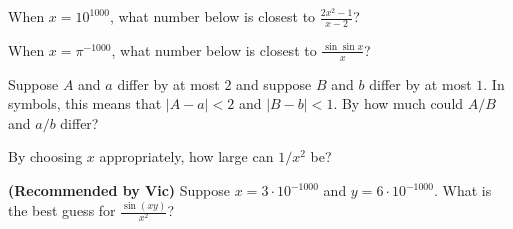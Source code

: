 \documentclass{ximera}
\newcommand{\recommendation}[1]{\textbf{(Recommended by #1)}}
\begin{document}
\begin{problem}
  When $x = 10^{1000}$, what number below is closest to $\frac{2x^2 - 1}{x-2}$? %
  \begin{multipleChoice}
  \end{multipleChoice}
\end{problem}

\begin{problem}
  When $x = \pi^{-1000}$, what number below is closest to $\frac{\sin \sin x}{x}$?
  \begin{multipleChoice}
  \end{multipleChoice}
\end{problem}

\begin{problem}
  Suppose $A$ and $a$ differ by at most $2$ and suppose $B$ and $b$
  differ by at most $1$.  In symbols, this means that $|A - a| < 2$ and $|B - b| < 1$.
  By how much could $A/B$ and $a/b$ differ?
  \begin{multipleChoice}
  \end{multipleChoice}
\end{problem}

\begin{problem}
  By choosing $x$ appropriately, how large can $1/x^2$ be?
  \begin{multipleChoice}
  \end{multipleChoice}
\end{problem}

\begin{problem}
\recommendation{Vic}
  Suppose $x = 3 \cdot 10^{-1000}$ and $y = 6 \cdot 10^{-1000}$.  What is the best guess for $\frac{\sin (xy)}{x^2}$?
  \begin{multipleChoice}
  \end{multipleChoice}
\end{problem}
\end{document}
